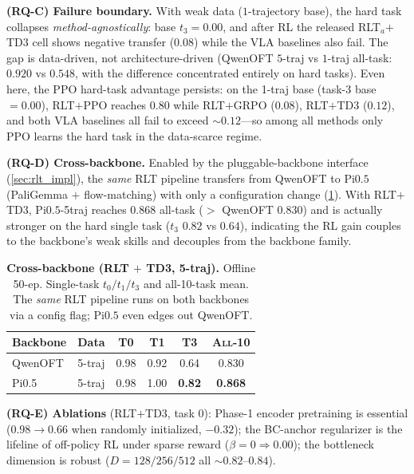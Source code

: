 \textbf{(RQ-C) Failure boundary.} With weak data ($1$-trajectory base), the hard task collapses \emph{method-agnostically}: base $t_3=0.00$, and after RL the released RLT$_a$$+$TD3 cell shows negative transfer ($0.08$) while the VLA baselines also fail. The gap is data-driven, not architecture-driven (QwenOFT $5$-traj vs $1$-traj all-task: $0.920$ vs $0.548$, with the difference concentrated entirely on hard tasks). Even here, the PPO hard-task advantage persists: on the 1-traj base (task-3 base $=0.00$), RLT$+$PPO reaches $0.80$ while RLT$+$GRPO ($0.08$), RLT$+$TD3 ($0.12$), and both VLA baselines all fail to exceed $\sim0.12$---so among all methods only PPO learns the hard task in the data-scarce regime.

\textbf{(RQ-D) Cross-backbone.} Enabled by the pluggable-backbone interface (\cref{sec:rlt_impl}), the \emph{same} RLT pipeline transfers from QwenOFT to Pi$0.5$ (PaliGemma $+$ flow-matching) with only a configuration change (\cref{tab:rlt_backbone}). With RLT$+$TD3, Pi$0.5$-5traj reaches $0.868$ all-task ($>$ QwenOFT $0.830$) and is actually stronger on the hard single task ($t_3$ $0.82$ vs $0.64$), indicating the RL gain couples to the backbone's weak skills and decouples from the backbone family.

\begin{table}[t]
    \centering
    \caption{\textbf{Cross-backbone (RLT $+$ TD3, 5-traj).} Offline 50-ep. Single-task $t_0/t_1/t_3$ and all-10-task mean. The \emph{same} RLT pipeline runs on both backbones via a config flag; Pi$0.5$ even edges out QwenOFT.}
    \label{tab:rlt_backbone}
    \vspace{0.3em}
    \footnotesize
    \setlength{\tabcolsep}{7pt}
    \renewcommand{\arraystretch}{1.15}
    \begin{tabular}{@{}l l ccc c@{}}
        \toprule
        \textbf{Backbone} & \textbf{Data} & \textsc{T0} & \textsc{T1} & \textsc{T3} & \textsc{All-10} \\
        \midrule
        QwenOFT & 5-traj & 0.98 & 0.92 & 0.64 & 0.830 \\
        Pi0.5   & 5-traj & 0.98 & 1.00 & \textbf{0.82} & \textbf{0.868} \\
        \bottomrule
    \end{tabular}
\end{table}

\textbf{(RQ-E) Ablations} (RLT$+$TD3, task $0$): Phase-1 encoder pretraining is essential ($0.98\!\to\!0.66$ when randomly initialized, $-0.32$); the BC-anchor regularizer is the lifeline of off-policy RL under sparse reward ($\beta{=}0\!\Rightarrow\!0.00$); the bottleneck dimension is robust ($D{=}128/256/512$ all ${\sim}0.82$--$0.84$).

